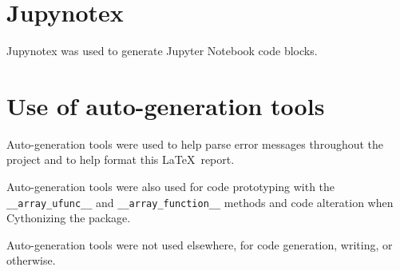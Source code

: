 \documentclass[11pt,a4paper]{article}
\begin{document}
\section{Jupynotex}
Jupynotex \citep{jupynotex} was used to generate Jupyter Notebook code blocks.
\section{Use of auto-generation tools}
Auto-generation tools were used to help parse error messages throughout the project and to help format this \LaTeX\ report.

Auto-generation tools were also used for code prototyping with the \texttt{\_\_array\_ufunc\_\_} and \texttt{\_\_array\_function\_\_} methods and code alteration when Cythonizing the package.

Auto-generation tools were not used elsewhere, for code generation, writing, or otherwise.
\end{document}
